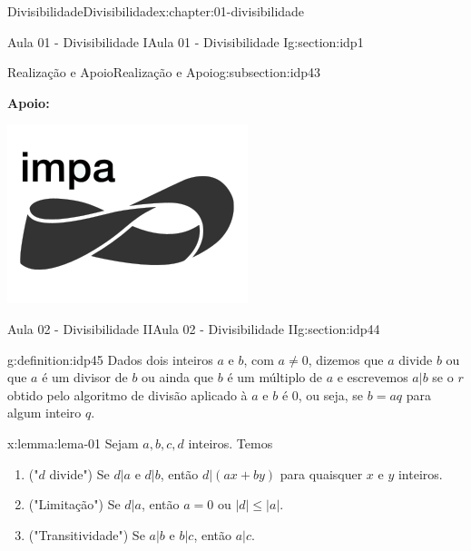 \documentclass[oneside,10pt,]{book}
\newcommand{\terminology}[1]{\textbf{#1}}
\numberwithin{equation}{section}
\begin{document}
\begin{chapterptx}{Divisibilidade}{}{Divisibilidade}{}{}{x:chapter:01-divisibilidade}
\begin{sectionptx}{Aula 01 - Divisibilidade I}{}{Aula 01 - Divisibilidade I}{}{}{g:section:idp1}
\begin{subsectionptx}{Realização e Apoio}{}{Realização e Apoio}{}{}{g:subsection:idp43}
\begin{image}{0.3}{0.4}{0.3}
\end{image}%
\terminology{Apoio:}%
\begin{image}{0.2}{0.6}{0.2}%
\includegraphics[width=\linewidth]{images/apoio}
\end{image}%
\end{subsectionptx}
\end{sectionptx}
%
%
\typeout{************************************************}
\typeout{************************************************}
%
\begin{sectionptx}{Aula 02 - Divisibilidade II}{}{Aula 02 - Divisibilidade II}{}{}{g:section:idp44}
\begin{definition}{}{g:definition:idp45}%
Dados dois inteiros \(a\) e \(b\), com \(a \neq 0\), dizemos que \(a\) divide \(b\) ou que \(a\) é um divisor de \(b\) ou ainda que \(b\) é um múltiplo de \(a\) e escrevemos \(a|b\) se o \(r\) obtido pelo algoritmo de divisão aplicado à \(a\) e \(b\) é \(0\), ou seja, se \(b = aq\) para algum inteiro \(q\).%
\end{definition}
\begin{lemma}{}{}{x:lemma:lema-01}%
Sejam \(a, b, c, d\) inteiros. Temos%
%
\begin{enumerate}[label=\roman*]
\item{}("\(d\) divide") Se \(d|a\) e \(d|b\), então \(d|(ax+by)\) para quaisquer \(x\) e \(y\) inteiros.%
\item{}("Limitação") Se \(d|a\), então \(a=0\) ou \(|d|\leq |a|\).%
\item{}("Transitividade") Se \(a|b\) e \(b|c\), então \(a|c\).%
\end{enumerate}

\end{lemma}
\end{sectionptx}
\end{chapterptx}
\end{document}
